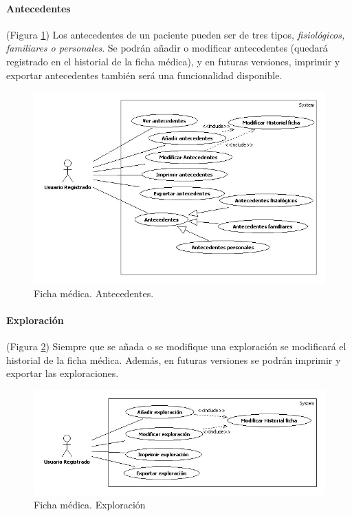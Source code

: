 \documentclass[a4paper,oneside,11pt]{book}
\begin{document}
			\paragraph{Antecedentes} %
			\label{par:antecedentes}
				(Figura \ref{fig:ant_fic}) Los antecedentes de un paciente pueden ser de tres tipos, \textit{fisiológicos, familiares o personales}. Se podrán añadir o modificar antecedentes (quedará registrado en el historial de la ficha médica), y en futuras versiones, imprimir y exportar antecedentes también será una funcionalidad disponible.
				\begin{figure}[H]
				  \centering
				    \includegraphics[width=14cm]{img/jpg/casos_uso/Antecedentes.jpg}
				  \caption{Ficha médica. Antecedentes.}
				  \label{fig:ant_fic}
				\end{figure}
			
			\paragraph{Exploración} %
			\label{par:exploracion}
				(Figura \ref{fig:exp_fic}) Siempre que se añada o se modifique una exploración se modificará el historial de la ficha médica. Además, en futuras versiones se podrán imprimir y exportar las exploraciones.
				\begin{figure}[H]
				  \centering
				    \includegraphics[width=14cm]{img/jpg/casos_uso/Exploracion.jpg}
				  \caption{Ficha médica. Exploración}
				  \label{fig:exp_fic}
				\end{figure}
			
\end{document}
